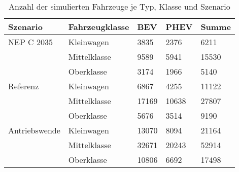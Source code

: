 {
\renewcommand{\arraystretch}{1.2}%
\begin{table}[H]
	\begin{center}
		\caption{Anzahl der simulierten Fahrzeuge je Typ, Klasse und Szenario}
		\begin{tabu} to \textwidth {X[1] X[1] X[1, r] X[1, r] X[1, r]}
			\toprule
			Szenario         & Fahrzeugklasse & BEV         & PHEV        & Summe       \\ \midrule
			NEP C \num{2035} & Kleinwagen     & \num{3835}  & \num{2376}  & \num{6211}  \\
							 & Mittelklasse   & \num{9589}  & \num{5941}  & \num{15530} \\
							 & Oberklasse     & \num{3174}  & \num{1966}  & \num{5140}  \\ \midrule
			Referenz         & Kleinwagen     & \num{6867}  & \num{4255}  & \num{11122} \\
							 & Mittelklasse   & \num{17169} & \num{10638} & \num{27807} \\
							 & Oberklasse     & \num{5676}  & \num{3514}  & \num{9190}  \\ \midrule
			Antriebswende    & Kleinwagen     & \num{13070} & \num{8094}  & \num{21164} \\
							 & Mittelklasse   & \num{32671} & \num{20243} & \num{52914} \\
							 & Oberklasse     & \num{10806} & \num{6692}  & \num{17498} \\ \bottomrule
		\end{tabu}
		\label{tab:car_count_long}
	\end{center}
	\vspace{-3mm}%
\end{table}
}